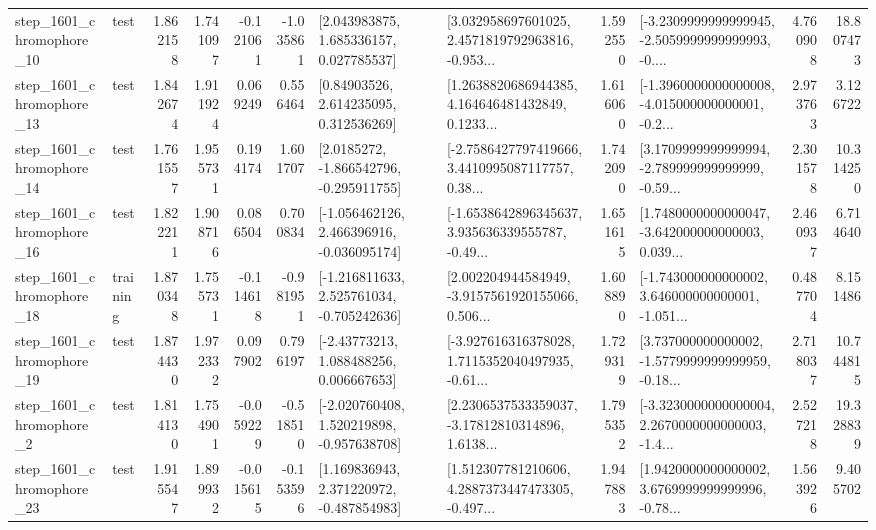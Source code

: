 \begin{tabular}{llrrrrllrlrr}
 step\_1601\_chromophore\_10 &      test &      1.862158 &    1.741097 &     -0.121061 & -1.035861 &     [2.043983875, 1.685336157, 0.027785537] &  [3.032958697601025, 2.4571819792963816, -0.953... &       1.592550 &  [-3.2309999999999945, -2.5059999999999993, -0.... &            4.760908 &         18.807473 \\
 step\_1601\_chromophore\_13 &      test &      1.842674 &    1.911924 &      0.069249 &  0.556464 &      [0.84903526, 2.614235095, 0.312536269] &  [1.2638820686944385, 4.164646481432849, 0.1233... &       1.616060 &  [-1.3960000000000008, -4.015000000000001, -0.2... &            2.973763 &          3.126722 \\
 step\_1601\_chromophore\_14 &      test &      1.761557 &    1.955731 &      0.194174 &  1.601707 &     [2.0185272, -1.866542796, -0.295911755] &  [-2.7586427797419666, 3.4410995087117757, 0.38... &       1.742090 &  [3.1709999999999994, -2.789999999999999, -0.59... &            2.301578 &         10.314250 \\
 step\_1601\_chromophore\_16 &      test &      1.822211 &    1.908716 &      0.086504 &  0.700834 &   [-1.056462126, 2.466396916, -0.036095174] &  [-1.6538642896345637, 3.935636339555787, -0.49... &       1.651615 &  [1.7480000000000047, -3.642000000000003, 0.039... &            2.460937 &          6.714640 \\
 step\_1601\_chromophore\_18 &  training &      1.870348 &    1.755731 &     -0.114618 & -0.981951 &   [-1.216811633, 2.525761034, -0.705242636] &  [2.002204944584949, -3.9157561920155066, 0.506... &       1.608890 &  [-1.743000000000002, 3.646000000000001, -1.051... &            0.487704 &          8.151486 \\
 step\_1601\_chromophore\_19 &      test &      1.874430 &    1.972332 &      0.097902 &  0.796197 &     [-2.43773213, 1.088488256, 0.006667653] &  [-3.927616316378028, 1.7115352040497935, -0.61... &       1.729319 &  [3.737000000000002, -1.5779999999999959, -0.18... &            2.718037 &         10.744815 \\
  step\_1601\_chromophore\_2 &      test &      1.814130 &    1.754901 &     -0.059229 & -0.518510 &   [-2.020760408, 1.520219898, -0.957638708] &  [2.2306537533359037, -3.17812810314896, 1.6138... &       1.795352 &  [-3.3230000000000004, 2.2670000000000003, -1.4... &            2.527218 &         19.328839 \\
 step\_1601\_chromophore\_23 &      test &      1.915547 &    1.899932 &     -0.015615 & -0.153596 &    [1.169836943, 2.371220972, -0.487854983] &  [1.512307781210606, 4.2887373447473305, -0.497... &       1.947883 &  [1.9420000000000002, 3.6769999999999996, -0.78... &            1.563926 &          9.405702 \\

\end{tabular}
